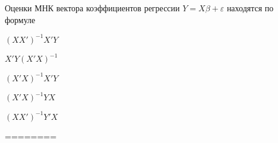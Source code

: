 
\begin{question}
Оценки МНК вектора коэффициентов регрессии \(Y=X\beta + \varepsilon\)
находятся по формуле
\begin{answerlist}
  \item \((XX')^{-1}X'Y\)
  \item \(X'Y(X'X)^{-1}\)
  \item \((X'X)^{-1}X'Y\)
  \item \((X'X)^{-1}YX\)
  \item \((XX')^{-1}Y'X\)
\end{answerlist}
\end{question}

\begin{solution}
========
\end{solution}

